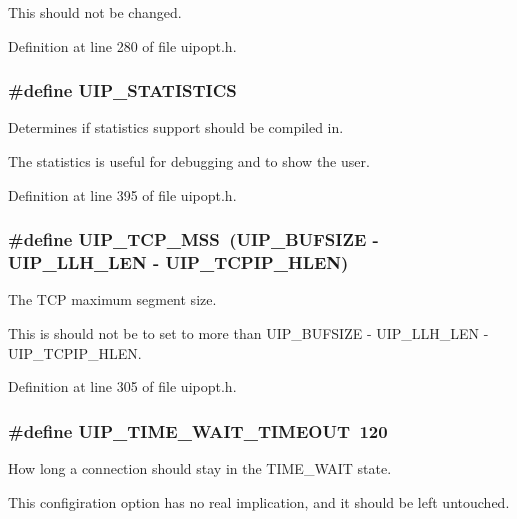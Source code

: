 This should not be changed. 

Definition at line 280 of file uipopt.h.

\hypertarget{group__uipopt_ga5726142fec34f35fb9ea19e5a45975c6}{
\subsubsection[{UIP\_\-STATISTICS}]{\setlength{\rightskip}{0pt plus 5cm}\#define UIP\_\-STATISTICS}}
\label{group__uipopt_ga5726142fec34f35fb9ea19e5a45975c6}
Determines if statistics support should be compiled in.

The statistics is useful for debugging and to show the user. 

Definition at line 395 of file uipopt.h.

\hypertarget{group__uipopt_ga4910467b83a639f06739c82cd362037e}{
\subsubsection[{UIP\_\-TCP\_\-MSS}]{\setlength{\rightskip}{0pt plus 5cm}\#define UIP\_\-TCP\_\-MSS~(UIP\_\-BUFSIZE -\/ UIP\_\-LLH\_\-LEN -\/ UIP\_\-TCPIP\_\-HLEN)}}
\label{group__uipopt_ga4910467b83a639f06739c82cd362037e}
The TCP maximum segment size.

This is should not be to set to more than UIP\_\-BUFSIZE -\/ UIP\_\-LLH\_\-LEN -\/ UIP\_\-TCPIP\_\-HLEN. 

Definition at line 305 of file uipopt.h.

\hypertarget{group__uipopt_ga2bc3b489923793759526a3181eb667fa}{
\subsubsection[{UIP\_\-TIME\_\-WAIT\_\-TIMEOUT}]{\setlength{\rightskip}{0pt plus 5cm}\#define UIP\_\-TIME\_\-WAIT\_\-TIMEOUT~120}}
\label{group__uipopt_ga2bc3b489923793759526a3181eb667fa}
How long a connection should stay in the TIME\_\-WAIT state.

This configiration option has no real implication, and it should be left untouched. 

